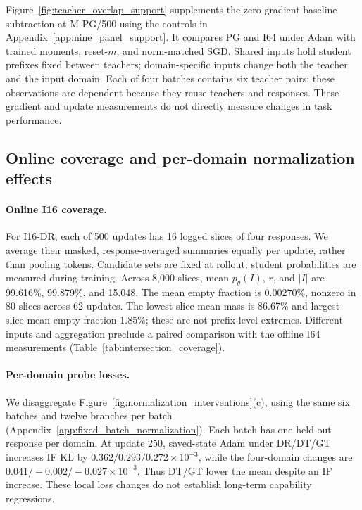 Figure~\ref{fig:teacher_overlap_support} supplements the zero-gradient baseline subtraction at M-PG/500 using the controls in Appendix~\ref{app:nine_panel_support}. It compares PG and I64 under Adam with trained moments, reset-$m$, and norm-matched SGD. Shared inputs hold student prefixes fixed between teachers; domain-specific inputs change both the teacher and the input domain. Each of four batches contains six teacher pairs; these observations are dependent because they reuse teachers and responses. These gradient and update measurements do not directly measure changes in task performance.

\clearpage
\subsection{Online coverage and per-domain normalization effects}
\label{app:i16_online_coverage}
\label{app:domain_probe_breakdown}

\paragraph{Online I16 coverage.}
For I16-DR, each of 500 updates has 16 logged slices of four responses. We average their masked, response-averaged summaries equally per update, rather than pooling tokens. Candidate sets are fixed at rollout; student probabilities are measured during training. Across 8,000 slices, mean $p_\theta(I)$, $r$, and $|I|$ are 99.616\%, 99.879\%, and 15.048. The mean empty fraction is 0.00270\%, nonzero in 80 slices across 62 updates. The lowest slice-mean mass is 86.67\% and largest slice-mean empty fraction 1.85\%; these are not prefix-level extremes. Different inputs and aggregation preclude a paired comparison with the offline I64 measurements (Table~\ref{tab:intersection_coverage}).

\paragraph{Per-domain probe losses.}
We disaggregate Figure~\ref{fig:normalization_interventions}(c), using the same six batches and twelve branches per batch (Appendix~\ref{app:fixed_batch_normalization}). Each batch has one held-out response per domain. At update 250, saved-state Adam under DR/DT/GT increases IF KL by $0.362/0.293/0.272\times10^{-3}$, while the four-domain changes are $0.041/-0.002/-0.027\times10^{-3}$. Thus DT/GT lower the mean despite an IF increase. These local loss changes do not establish long-term capability regressions.

